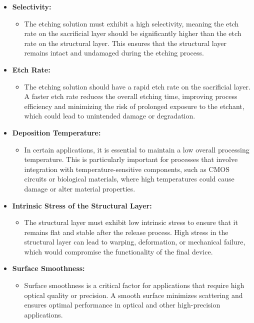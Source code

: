 \documentclass{report}
\begin{document}
\begin{itemize}
    \item \textbf{Selectivity:}
    \begin{itemize}
        \item The etching solution must exhibit a high selectivity, meaning the etch rate on the sacrificial layer should be significantly higher than the etch rate on the structural layer. This ensures that the structural layer remains intact and undamaged during the etching process.
    \end{itemize}
    \item \textbf{Etch Rate:}
    \begin{itemize}
        \item The etching solution should have a rapid etch rate on the sacrificial layer. A faster etch rate reduces the overall etching time, improving process efficiency and minimizing the risk of prolonged exposure to the etchant, which could lead to unintended damage or degradation.
    \end{itemize}
    \item \textbf{Deposition Temperature:}
    \begin{itemize}
        \item In certain applications, it is essential to maintain a low overall processing temperature. This is particularly important for processes that involve integration with temperature-sensitive components, such as CMOS circuits or biological materials, where high temperatures could cause damage or alter material properties.
    \end{itemize}
    \item \textbf{Intrinsic Stress of the Structural Layer:}
    \begin{itemize}
        \item The structural layer must exhibit low intrinsic stress to ensure that it remains flat and stable after the release process. High stress in the structural layer can lead to warping, deformation, or mechanical failure, which would compromise the functionality of the final device.
    \end{itemize}
    \item \textbf{Surface Smoothness:}
    \begin{itemize}
        \item Surface smoothness is a critical factor for applications that require high optical quality or precision. A smooth surface minimizes scattering and ensures optimal performance in optical and other high-precision applications.
    \end{itemize}
\end{itemize}
\end{document}
